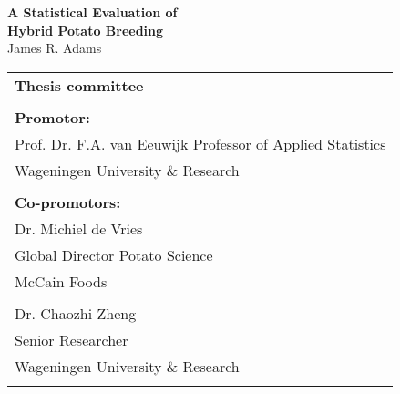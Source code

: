 \thispagestyle{empty}
\begin{center}
\Huge{\textbf{A Statistical Evaluation of}} \\
\Huge{\textbf{Hybrid Potato Breeding}} \\
\vspace*{1cm}
\vspace*{1cm}
\vspace*{\fill}
\large{James R. Adams}\\
\end{center}

\newpage
\thispagestyle{empty}
\vspace*{\fill}
\begin{tabular}{l}
    \textbf{Thesis committee}                                                                 \\  
                                                                                              \\  
    \textbf{Promotor:}                                                                        \\  
    Prof. Dr. F.A. van Eeuwijk
    Professor of Applied Statistics                                   \\  
    Wageningen University \& Research                                                                    \\  
                                                                                              \\  
    \textbf{Co-promotors:}                                                                    \\  
    Dr. Michiel de Vries                                                                   \\  
    Global Director Potato Science              \\  
    McCain Foods                                                               \\  
\\
    Dr. Chaozhi Zheng                                                                      \\  
    Senior Researcher                                                                        \\  
    Wageningen University \& Research                                                          \\
                                                                                         \\  


\end{tabular}
